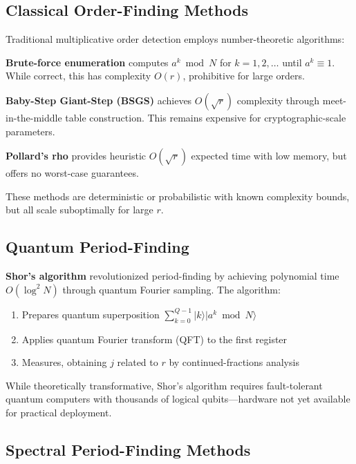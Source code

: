 \documentclass[conference]{IEEEtran}
\begin{document}
\subsection{Classical Order-Finding Methods}

Traditional multiplicative order detection employs number-theoretic algorithms:

\textbf{Brute-force enumeration} computes $a^k \bmod N$ for $k = 1, 2, \ldots$ until $a^k \equiv 1$. While correct, this has complexity $O(r)$, prohibitive for large orders.

\textbf{Baby-Step Giant-Step (BSGS)}\cite{shanks1971class} achieves $O(\sqrt{r})$ complexity through meet-in-the-middle table construction. This remains expensive for cryptographic-scale parameters.

\textbf{Pollard's rho}\cite{pollard1978monte,pollard1975monte} provides heuristic $O(\sqrt{r})$ expected time with low memory, but offers no worst-case guarantees.

These methods are deterministic or probabilistic with known complexity bounds, but all scale suboptimally for large $r$.

\subsection{Quantum Period-Finding}

\textbf{Shor's algorithm}\cite{shor1997polynomial} revolutionized period-finding by achieving polynomial time $O(\log^2 N)$ through quantum Fourier sampling. The algorithm:
\begin{enumerate}
    \item Prepares quantum superposition $\sum_{k=0}^{Q-1} |k\rangle |a^k \bmod N\rangle$
    \item Applies quantum Fourier transform (QFT) to the first register
    \item Measures, obtaining $j$ related to $r$ by continued-fractions analysis
\end{enumerate}

While theoretically transformative, Shor's algorithm requires fault-tolerant quantum computers with thousands of logical qubits—hardware not yet available for practical deployment\cite{preskill2018quantum}.

\subsection{Spectral Period-Finding Methods}
\end{document}
